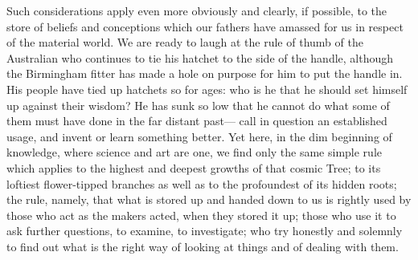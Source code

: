 \documentclass[12pt]{article}
\begin{document}
Such considerations apply even more obviously and clearly, if possible, to the store of beliefs and conceptions which our fathers have amassed for us in respect of the material world. We are ready to laugh at the rule of thumb of the Australian who continues to tie his hatchet to the side of the handle, although the Birmingham fitter has made a hole on purpose for him to put the handle in. His people have tied up hatchets so for ages: who is he that he should set himself up against their wisdom? He has sunk so low that he cannot do what some of them must have done in the far distant past--- call in question an established usage, and invent or learn something better. Yet here, in the dim beginning of knowledge, where science and art are one, we find only the same simple rule which applies to the highest and deepest growths of that cosmic Tree; to its loftiest flower-tipped branches as well as to the profoundest of its hidden roots; the rule, namely, that what is stored up and handed down to us is rightly used by those who act as the makers acted, when they stored it up; those who use it to ask further questions, to examine, to investigate; who try honestly and solemnly to find out what is the right way of looking at things and of dealing with them.
\end{document}
